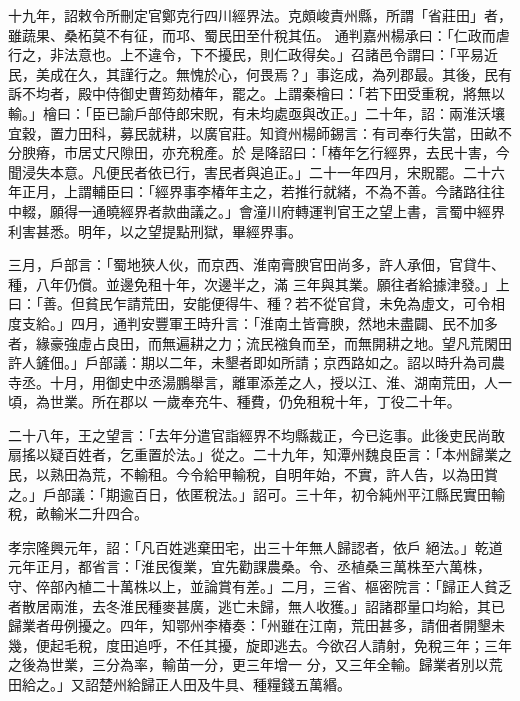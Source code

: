 \begin{pinyinscope}
 十九年，詔敕令所刪定官鄭克行四川經界法。克頗峻責州縣，所謂「省莊田」者，雖蔬果、桑柘莫不有征，而邛、蜀民田至什稅其伍。
 通判嘉州楊承曰：「仁政而虐行之，非法意也。上不違令，下不擾民，則仁政得矣。」召諸邑令謂曰：「平易近民，美成在久，其謹行之。無愧於心，何畏焉？」事迄成，為列郡最。其後，民有訴不均者，殿中侍御史曹筠劾椿年，罷之。上謂秦檜曰：「若下田受重稅，將無以輸。」檜曰：「臣已諭戶部侍郎宋貺，有未均處亟與改正。」二十年，詔：兩淮沃壤宜穀，置力田科，募民就耕，以廣官莊。知資州楊師錫言：有司奉行失當，田畝不分腴瘠，市居丈尺隙田，亦充稅產。於
 是降詔曰：「椿年乞行經界，去民十害，今聞浸失本意。凡便民者依已行，害民者與追正。」二十一年四月，宋貺罷。二十六年正月，上謂輔臣曰：「經界事李椿年主之，若推行就緒，不為不善。今諸路往往中輟，願得一通曉經界者款曲議之。」會潼川府轉運判官王之望上書，言蜀中經界利害甚悉。明年，以之望提點刑獄，畢經界事。



 三月，戶部言：「蜀地狹人伙，而京西、淮南膏腴官田尚多，許人承佃，官貸牛、種，八年仍償。並邊免租十年，次邊半之，滿
 三年與其業。願往者給據津發。」上曰：「善。但貧民乍請荒田，安能便得牛、種？若不從官貸，未免為虛文，可令相度支給。」四月，通判安豐軍王時升言：「淮南土皆膏腴，然地未盡闢、民不加多者，緣豪強虛占良田，而無遍耕之力；流民襁負而至，而無開耕之地。望凡荒閑田許人鏟佃。」戶部議：期以二年，未墾者即如所請；京西路如之。詔以時升為司農寺丞。十月，用御史中丞湯鵬舉言，離軍添差之人，授以江、淮、湖南荒田，人一頃，為世業。所在郡以
 一歲奉充牛、種費，仍免租稅十年，丁役二十年。



 二十八年，王之望言：「去年分遣官詣經界不均縣裁正，今已迄事。此後吏民尚敢扇搖以疑百姓者，乞重置於法。」從之。二十九年，知潭州魏良臣言：「本州歸業之民，以熟田為荒，不輸租。今令給甲輸稅，自明年始，不實，許人告，以為田賞之。」戶部議：「期逾百日，依匿稅法。」詔可。三十年，初令純州平江縣民實田輸稅，畝輸米二升四合。



 孝宗隆興元年，詔：「凡百姓逃棄田宅，出三十年無人歸認者，依戶
 絕法。」乾道元年正月，都省言：「淮民復業，宜先勸課農桑。令、丞植桑三萬株至六萬株，守、倅部內植二十萬株以上，並論賞有差。」二月，三省、樞密院言：「歸正人貧乏者散居兩淮，去冬淮民種麥甚廣，逃亡未歸，無人收獲。」詔諸郡量口均給，其已歸業者毋例擾之。四年，知鄂州李椿奏：「州雖在江南，荒田甚多，請佃者開墾未幾，便起毛稅，度田追呼，不任其擾，旋即逃去。今欲召人請射，免稅三年；三年之後為世業，三分為率，輸苗一分，更三年增一
 分，又三年全輸。歸業者別以荒田給之。」又詔楚州給歸正人田及牛具、種糧錢五萬緡。




\end{pinyinscope}
